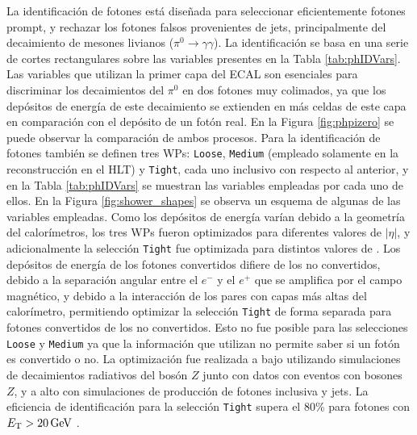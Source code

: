 La identificación de fotones está diseñada para seleccionar eficientemente fotones prompt, y rechazar los fotones falsos provenientes de jets, principalmente del decaimiento de mesones livianos ($\pi^{0}\to\gamma\gamma$). La identificación se basa en una serie de cortes rectangulares sobre las variables presentes en la Tabla \ref{tab:phIDVars}. Las variables que utilizan la primer capa del ECAL son esenciales para discriminar los decaimientos del $\pi^{0}$ en dos fotones muy colimados, ya que los depósitos de energía de este decaimiento se extienden en más celdas de este capa en comparación con el depósito de un fotón real. En la Figura \ref{fig:phpizero} se puede observar la comparación de ambos procesos. 
Para la identificación de fotones también se definen tres WPs: \texttt{Loose}, \texttt{Medium} (empleado solamente en la reconstrucción en el HLT) y \texttt{Tight}, cada uno inclusivo con respecto al anterior, y en la Tabla \ref{tab:phIDVars} se muestran las variables empleadas por cada uno de ellos. En la Figura \ref{fig:shower_shapes} se observa un esquema de algunas de las variables empleadas.
Como los depósitos de energía varían debido a la geometría del calorímetros, los tres WPs fueron optimizados para diferentes valores de $|\eta|$, y adicionalmente la selección \texttt{Tight} fue optimizada para distintos valores de \ET. Los depósitos de energía de los fotones convertidos difiere de los no convertidos, debido a la separación angular entre el $e^-$ y el $e^+$ que se amplifica por el campo magnético, y debido a la interacción de los pares con capas más altas del calorímetro, permitiendo optimizar la selección \texttt{Tight} de forma separada para fotones convertidos de los no convertidos. Esto no fue posible para las selecciones \texttt{Loose} y \texttt{Medium} ya que la información que utilizan no permite saber si un fotón es convertido o no. La optimización fue realizada a bajo \ET utilizando simulaciones de decaimientos radiativos del bosón $Z$ junto con datos con eventos con bosones $Z$, y a alto \ET con simulaciones de producción de fotones inclusiva y jets. La eficiencia de identificación para la selección \texttt{Tight} supera el 80\% para fotones con $E_{\text{T}}>20\,\text{GeV}$ \cite{EGAM-2018-01}.

